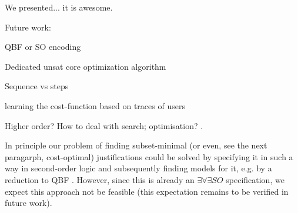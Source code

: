 
We presented... it is awesome.

Future work:
\begin{compactitem}
 \item QBF or SO encoding
 \item Dedicated unsat core optimization algorithm
  \item Sequence vs steps
  \item learning the cost-function based on traces of users
  \item 
\end{compactitem}

% 
Higher order? How to deal with search; optimisation? .


In principle our problem of finding subset-minimal (or even, see the next paragarph, cost-optimal) justifications could be solved by specifying it in such a way in second-order logic and subsequently finding models for it, e.g. by a reduction to QBF \cite{kr/BogaertsTS16,kr/vanderHallenJ18}. 
However, since this is already an $\exists\forall\exists SO$ specification, we expect this approach not be feasible (this expectation remains to be verified in future work). 
